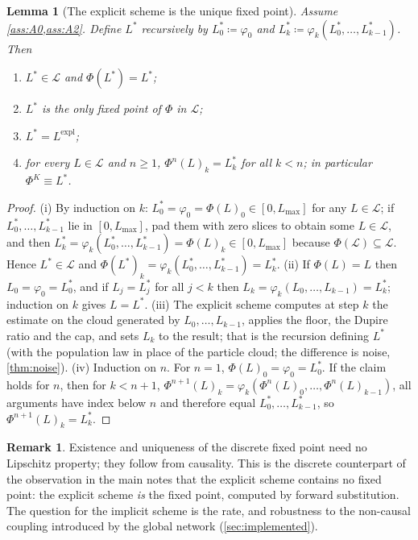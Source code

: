 \documentclass[11pt,a4paper]{article}
\theoremstyle{plain}
\newtheorem{lemma}[theorem]{Lemma}
\theoremstyle{definition}
\theoremstyle{definition}
\newtheorem{remark}[theorem]{Remark}
\newcommand{\Lev}{L}
\newcommand{\Phimap}{\Phi}
\newcommand{\Lset}{\mathcal{L}}
\newcommand{\Lmax}{L_{\max}}
\newcommand{\Lexpl}{\Lev^{\mathrm{expl}}}
\begin{document}
\begin{lemma}[The explicit scheme is the unique fixed point]\label{lem:explicit}
Assume \cref{ass:A0,ass:A2}. Define $\Lev^*$ recursively by $\Lev^*_0 \coloneqq \varphi_0$ and $\Lev^*_k \coloneqq \varphi_k(\Lev^*_0, \dots, \Lev^*_{k-1})$. Then
\begin{enumerate}
\item[(i)] $\Lev^* \in \Lset$ and $\Phimap(\Lev^*) = \Lev^*$;
\item[(ii)] $\Lev^*$ is the only fixed point of $\Phimap$ in $\Lset$;
\item[(iii)] $\Lev^* = \Lexpl$;
\item[(iv)] for every $\Lev \in \Lset$ and $n \ge 1$, $\Phimap^n(\Lev)_k = \Lev^*_k$ for all $k < n$; in particular $\Phimap^K \equiv \Lev^*$.
\end{enumerate}
\end{lemma}

\begin{proof}
(i) By induction on $k$: $\Lev^*_0 = \varphi_0 = \Phimap(\Lev)_0 \in [0, \Lmax]$ for any $\Lev \in \Lset$; if $\Lev^*_0, \dots, \Lev^*_{k-1}$ lie in $[0, \Lmax]$, pad them with zero slices to obtain some $\Lev \in \Lset$, and then $\Lev^*_k = \varphi_k(\Lev^*_0, \dots, \Lev^*_{k-1}) = \Phimap(\Lev)_k \in [0, \Lmax]$ because $\Phimap(\Lset) \subseteq \Lset$. Hence $\Lev^* \in \Lset$ and $\Phimap(\Lev^*)_k = \varphi_k(\Lev^*_0, \dots, \Lev^*_{k-1}) = \Lev^*_k$.
(ii) If $\Phimap(\Lev) = \Lev$ then $\Lev_0 = \varphi_0 = \Lev^*_0$, and if $\Lev_j = \Lev^*_j$ for all $j < k$ then $\Lev_k = \varphi_k(\Lev_0, \dots, \Lev_{k-1}) = \Lev^*_k$; induction on $k$ gives $\Lev = \Lev^*$.
(iii) The explicit scheme computes at step $k$ the estimate on the cloud generated by $\Lev_0, \dots, \Lev_{k-1}$, applies the floor, the Dupire ratio and the cap, and sets $\Lev_k$ to the result; that is the recursion defining $\Lev^*$ (with the population law in place of the particle cloud; the difference is noise, \cref{thm:noise}).
(iv) Induction on $n$. For $n = 1$, $\Phimap(\Lev)_0 = \varphi_0 = \Lev^*_0$. If the claim holds for $n$, then for $k < n+1$, $\Phimap^{n+1}(\Lev)_k = \varphi_k(\Phimap^n(\Lev)_0, \dots, \Phimap^n(\Lev)_{k-1})$, all arguments have index below $n$ and therefore equal $\Lev^*_0, \dots, \Lev^*_{k-1}$, so $\Phimap^{n+1}(\Lev)_k = \Lev^*_k$.
\end{proof}

\begin{remark}
Existence and uniqueness of the discrete fixed point need no Lipschitz property; they follow from causality. This is the discrete counterpart of the observation in the main notes that the explicit scheme contains no fixed point: the explicit scheme \emph{is} the fixed point, computed by forward substitution. The question for the implicit scheme is the rate, and robustness to the non-causal coupling introduced by the global network (\cref{sec:implemented}).
\end{remark}
\end{document}
